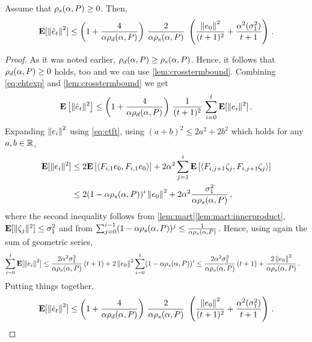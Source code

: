 \begin{theorem}\label{th:pdrate}
Assume that $\rho_s(\alpha,P)\ge 0$. Then,
\begin{align}
\mathbf{E}[\left\| \hat{e}_t\right\|^2]
\leq \left(1+\frac4{\alpha\rho_d(\alpha,P)}\right)\, \frac2{\alpha\rho_s(\alpha,P)}\, \,
\left(\frac{\left\| e_0\right\|^2}{(t+1)^2}+ \frac{\alpha^2(\sigma_1^2)}{t+1} \right)\,.
\end{align}
\end{theorem}
\begin{proof}
As it was noted earlier, $\rho_d(\alpha,P)\ge \rho_s(\alpha,P)$. Hence, it follows that $\rho_d(\alpha,P)\ge 0$ holds, too
and we can use  \cref{lem:crosstermbound}.
Combining \eqref{eq:ehtexp} and \cref{lem:crosstermbound} we get
\begin{align*}
\mathbf{E}\left[\| \hat{e}_t\|^2\right] \le  
\left( 1+\frac4{\alpha\rho_d(\alpha,P)} \right)\,
\frac{1}{(t+1)^2} \, \sum_{i=0}^{t}\mathbf{E}[\| e_i\|^2]\,.
\end{align*}
Expanding $\left\| e_i\right\|^2$ using \eqref{eq:etft},
using $(a+b)^2\leq 2 a^2+2 b^2$ which holds for any $a,b\in \mathbb{R}$,
\begin{align*}
\mathbf{E}[\| e_i\|^2]
&\le  2 \mathbf{E}\left[\langle F_{i,1}e_0,F_{i,1}e_0\rangle\right]+2 \alpha^2\sum_{j=1}^i\mathbf{E}\left[\langle F_{i,j+1}\zeta_j, F_{i,j+1}\zeta_j\rangle\right]\\
& \le 2 (1-\alpha\rho_s(\alpha,P))^i\left\| e_0\right\|^2+ 2 \alpha^2\frac{{\sigma}_1^2}{\alpha \rho_s(\alpha,P)}\,,
\end{align*}
where the second inequality follows from 
 \cref{lem:mart}\ref{lem:mart:innerproduct}, $\mathbf{E}[ \| \zeta_j\|^2 ] \le \sigma_1^2$
 and from  $\sum_{j=0}^{i-1} (1-\alpha \rho_s(\alpha,P))^j\leq \frac{1}{\alpha \rho_s(\alpha,P)}$. 
 Hence, using again the sum of geometric series,
\begin{align*}
\sum_{i=0}^t \mathbf{E}[ \left\| e_i\right\|^2 ] 
& \le
\frac{ 2 \alpha^2{\sigma}_1^2}{\alpha \rho_s(\alpha,P)}\,(t+1) +
 2 \left\| e_0\right\|^2 \sum_{i=0}^t(1-\alpha\rho_s(\alpha,P))^i  
 \le
\frac{ 2 \alpha^2 {\sigma}_1^2}{\alpha \rho_s(\alpha,P)}\,(t+1) +
 \frac{2 \left\| e_0\right\|^2}{\alpha\rho_s(\alpha,P)} \,.
\end{align*}
Putting things together,
\begin{align*}
\mathbf{E}[\left\| \hat{e}_t\right\|^2]
\leq \left(1+\frac4{\alpha\rho_d(\alpha,P)}\right)\, \frac2{\alpha\rho_s(\alpha,P)}\, \,
\left(\frac{\left\| e_0\right\|^2}{(t+1)^2}+ \frac{\alpha^2(\sigma_1^2)}{t+1} \right)\,.
\end{align*}
\end{proof}


